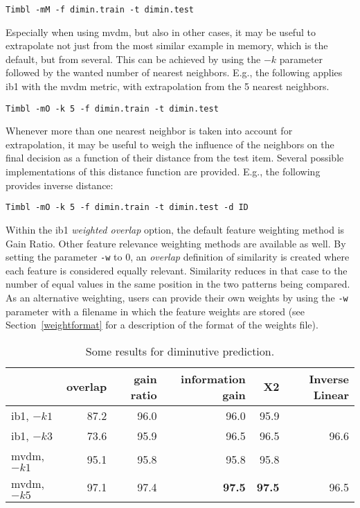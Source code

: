 \documentclass{report}
\begin{document}
{\small
\begin{verbatim}
Timbl -mM -f dimin.train -t dimin.test
\end{verbatim}
}

Especially when using {\sc mvdm}, but also in other cases, it may be
useful to extrapolate not just from the most similar example in
memory, which is the default, but from several. This can be achieved
by using the $-k$ parameter followed by the wanted number of nearest
neighbors. E.g., the following applies {\sc ib1} with the {\sc mvdm}
metric, with extrapolation from the 5 nearest neighbors.

{\small
\begin{verbatim}
Timbl -mO -k 5 -f dimin.train -t dimin.test
\end{verbatim}
}

Whenever more than one nearest neighbor is taken into account for
extrapolation, it may be useful to weigh the influence of the
neighbors on the final decision as a function of their distance from
the test item. Several possible implementations of this distance
function are provided. E.g., the following provides inverse distance: 

{\small
\begin{verbatim}
Timbl -mO -k 5 -f dimin.train -t dimin.test -d ID
\end{verbatim}
}

Within the {\sc ib1} {\em weighted overlap} option, the default
feature weighting method is Gain Ratio. Other feature relevance
weighting methods are available as well.  By setting the parameter
{\tt -w} to 0, an {\em overlap} definition of similarity is created
where each feature is considered equally relevant. Similarity reduces
in that case to the number of equal values in the same position in the
two patterns being compared. As an alternative weighting, users can
provide their own weights by using the {\tt -w} parameter with a
filename in which the feature weights are stored (see
Section~\ref{weightformat} for a description of the format of the
weights file).

\begin{table}
\begin{center}
\begin{tabular}{|l|r|r|r|r|r|}\hline
             & overlap & gain ratio & information gain & X2 & Inverse Linear\\
\hline
{\sc ib1}, $-k1$ & 87.2 & 96.0 & 96.0 & 95.9 & \\
{\sc ib1}, $-k3$ & 73.6 & 95.9 & 96.5 & 96.5 & 96.6 \\
{\sc mvdm}, $-k1$ & 95.1  & 95.8 & 95.8 & 95.8 & \\
{\sc mvdm}, $-k5$ & 97.1 & 97.4 & {\bf 97.5} & {\bf 97.5} & 96.5\\
\hline
\end{tabular}
\caption{Some results for diminutive prediction.}
\label{diminresults}
\end{center}
\end{table}
\end{document}
